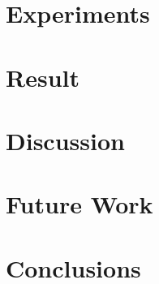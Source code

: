 \documentclass[tocnosub,noragright,centerchapter,fullpagesingle,12pt]{uiuc_csthesis21}
\theoremstyle{definition}
\numberwithin{algocf}{chapter}     %
\begin{document}
\chapter{Experiments}
\label{chp:approach}


\chapter{Result}
\label{chp:approach}


\chapter{Discussion}
\label{chp:approach}


\chapter{Future Work}
\label{chp:approach}




\chapter{Conclusions}
\label{chp:concl}
  
\end{document}
